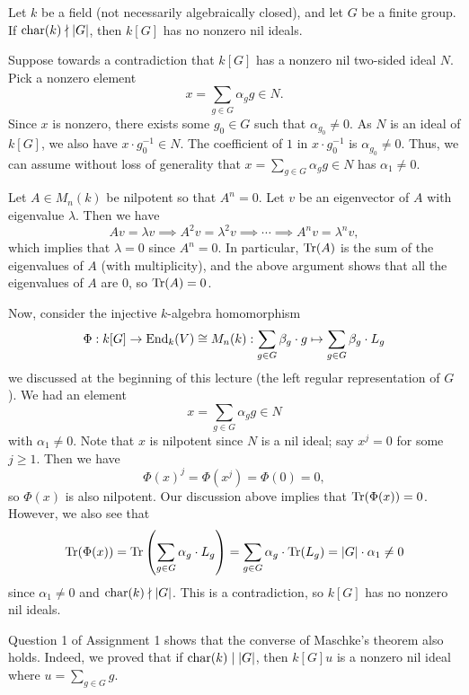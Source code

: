 \begin{thm}[Maschke]
Let $k$ be a field (not necessarily algebraically closed), and let $G$ be a finite group. If 
$\operatorname{char}(k) \nmid |G|$, then $k[G]$ has no nonzero nil ideals. 
\end{thm}
\begin{pf}
Suppose towards a contradiction that $k[G]$ has a nonzero nil two-sided ideal $N$. Pick a nonzero 
element 
\[ x = \sum_{g \in G} \alpha_g g \in N. \]
Since $x$ is nonzero, there exists some $g_0 \in G$ such that $\alpha_{g_0} \neq 0$. As 
$N$ is an ideal of $k[G]$, we also have $x \cdot g_0^{-1} \in N$. The coefficient of $1$ in 
$x \cdot g_0^{-1}$ is $\alpha_{g_0} \neq 0$. Thus, we can assume without loss of generality that 
$x = \sum_{g \in G} \alpha_g g \in N$ has $\alpha_1 \neq 0$. 

Let $A \in M_n(k)$ be nilpotent so that $A^n = 0$. Let $v$ be an eigenvector of $A$ with eigenvalue $\lambda$. Then we have 
\[ Av = \lambda v \implies A^2v = \lambda^2v \implies \cdots \implies A^n v = \lambda^n v, \]
which implies that $\lambda = 0$ since $A^n = 0$. In particular, $\operatorname{Tr}(A)$ is the sum of the 
eigenvalues of $A$ (with multiplicity), and the above argument shows that all the eigenvalues of 
$A$ are $0$, so $\operatorname{Tr}(A) = 0$.

Now, consider the injective $k$-algebra homomorphism 
\begin{align*}
    \Phi : k[G] \to \operatorname{End}_k(V) \cong M_n(k) : \sum_{g \in G} \beta_g \cdot g \mapsto \sum_{g \in G} \beta_g \cdot L_g
\end{align*}
we discussed at the beginning of this lecture (the left regular representation of $G$). We had an 
element 
\[ x = \sum_{g \in G} \alpha_g g \in N \]
with $\alpha_1 \neq 0$. Note that $x$ is nilpotent since $N$ is a nil ideal; say
$x^j = 0$ for some $j \geq 1$. Then we have 
\[ \Phi(x)^j = \Phi(x^j) = \Phi(0) = 0, \]
so $\Phi(x)$ is also nilpotent. Our discussion above implies that $\operatorname{Tr}(\Phi(x)) = 0$. However, 
we also see that 
\[ \operatorname{Tr}(\Phi(x)) = \operatorname{Tr}\left( \sum_{g \in G} \alpha_g \cdot L_g \right)
= \sum_{g \in G} \alpha_g \cdot \operatorname{Tr}(L_g) = |G| \cdot \alpha_1 \neq 0 \]
since $\alpha_1 \neq 0$ and $\operatorname{char}(k) \nmid |G|$. This is a contradiction, so $k[G]$ has 
no nonzero nil ideals. 
\end{pf}

\begin{remark}
Question 1 of Assignment 1 shows that the converse of Maschke's theorem also holds. Indeed, we 
proved that if $\operatorname{char}(k) \mid |G|$, then $k[G]u$ is a nonzero nil ideal where $u = \sum_{g \in G} g$. 
\end{remark}

